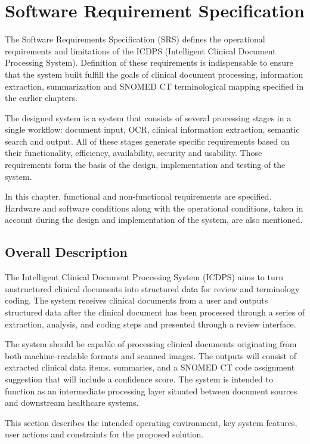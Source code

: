 \chapter{Software Requirement Specification}

The Software Requirements Specification (SRS) defines the operational requirements and limitations of the ICDPS (Intelligent Clinical Document Processing System). Definition of these requirements is indispensable to ensure that the system built fulfill the goals of clinical document processing, information extraction, summarization and SNOMED CT terminological mapping specified in the earlier chapters.

The designed system is a system that consists of several processing stages in a single workflow: document input, OCR, clinical information extraction, semantic search and output. All of these stages generate specific requirements based on their functionality, efficiency, availability, security and usability. Those requirements form the basis of the design, implementation and testing of the system.

In this chapter, functional and non-functional requirements are specified. Hardware and software conditions along with the operational conditions, taken in account during the design and implementation of the system, are also mentioned.

\section{Overall Description}

The Intelligent Clinical Document Processing System (ICDPS) aims to turn unstructured clinical documents into structured data for review and terminology coding. The system receives clinical documents from a user and outputs structured data after the clinical document has been processed through a series of extraction, analysis, and coding steps and presented through a review interface.

The system should be capable of processing clinical documents originating from both machine-readable formats and scanned images. The outputs will consist of extracted clinical data items, summaries, and a SNOMED CT code assignment suggestion that will include a confidence score. The system is intended to function as an intermediate processing layer situated between document sources and downstream healthcare systems.

This section describes the intended operating environment, key system features, user actions and constraints for the proposed solution.


